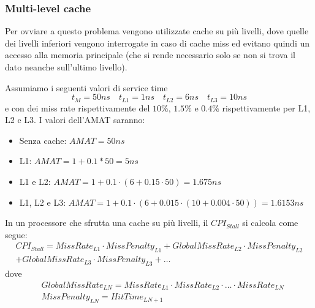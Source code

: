 \subsubsection{Multi-level cache}
Per ovviare a questo problema vengono utilizzate cache su più livelli, dove quelle dei livelli inferiori vengono interrogate in caso di cache miss ed evitano quindi un accesso alla memoria principale (che si rende necessario solo se non si trova il dato neanche sull'ultimo livello).
\begin{example}
	Assumiamo i seguenti valori di service time
	\begin{equation*}
		t_M = 50ns \quad t_{L1}=1ns \quad t_{L2}=6ns \quad t_{L3}=10ns
	\end{equation*}
	e con dei miss rate rispettivamente del $10\%$, $1.5\%$ e $0.4\%$ rispettivamente per L1, L2 e L3. I valori dell'AMAT saranno:
	\begin{itemize}
		\item Senza cache: $AMAT = 50ns$
		\item L1: $AMAT=1+0.1*50=5ns$
		\item L1 e L2: $AMAT=1+0.1 \cdot (6+0.15\cdot50)=1.675ns$
		\item L1, L2 e L3: $AMAT=1+0.1\cdot (6+0.015 \cdot (10+0.004\cdot50))=1.6153ns$
	\end{itemize}
\end{example}
In un processore che sfrutta una cache su più livelli, il $CPI_{Stall}$ si calcola come segue:
\begin{equation}
	\begin{split}
		CPI_{Stall}=MissRate_{L1} \cdot MissPenalty_{L1} + GlobalMissRate_{L2} \cdot MissPenalty_{L2} \\
		+ GlobalMissRate_{L3} \cdot MissPenalty_{L3} + \ldots 
	\end{split}
\end{equation}
dove
\begin{equation*}
	\begin{split}
		&GlobalMissRate_{LN}=MissRate_{L1} \cdot MissRate_{L2} \cdot \ldots \cdot MissRate_{LN}\\
		&MissPenalty_{LN} = HitTime_{LN+1}
	\end{split}
\end{equation*}

